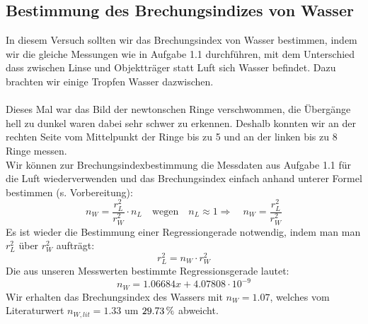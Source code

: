 \documentclass[a4paper,titlepage]{scrartcl}
\numberwithin{equation}{section}
\begin{document}
\subsection{Bestimmung des Brechungsindizes von Wasser}
In diesem Versuch sollten wir das Brechungsindex von Wasser bestimmen, indem wir die gleiche Messungen wie in Aufgabe 1.1 durchführen, mit dem Unterschied dass zwischen Linse und Objektträger statt Luft sich Wasser befindet. Dazu brachten wir einige Tropfen Wasser dazwischen.\\ \\
Dieses Mal war das Bild der newtonschen Ringe verschwommen, die Übergänge hell zu dunkel waren dabei sehr schwer zu erkennen. Deshalb konnten wir an der rechten Seite vom Mittelpunkt der Ringe bis zu 5 und an der linken bis zu 8 Ringe messen.\\
Wir können zur Brechungsindexbestimmung die Messdaten aus Aufgabe 1.1 für die Luft wiederverwenden und das Brechungsindex einfach anhand unterer Formel bestimmen (s. Vorbereitung):
\begin{equation*}
n_W=\frac{r_L^2}{r_W^2} \cdot n_L \quad \text{wegen} \quad n_L \approx 1 \Rightarrow \quad n_W=\frac{r_L^2}{r_W^2}
\end{equation*}
Es ist wieder die Bestimmung einer Regressiongerade notwendig, indem man man $r_L^2$ über $r_W^2$ aufträgt:
\begin{equation*}
r_L^2=n_W\cdot r_W^2
\end{equation*}
Die aus unseren Messwerten bestimmte Regressionsgerade lautet:
\begin{equation*}
n_W=1.06684x + 4.07808 \cdot 10^{-9}
\end{equation*}
Wir erhalten das Brechungsindex des Wassers mit $n_W=1.07$, welches vom Literaturwert $n_{W,lit}=1.33$ um $\unit[29.73]{\%}$ abweicht.
\end{document}
